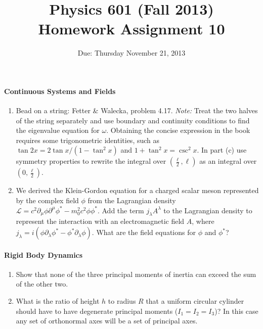 \documentclass[letterpaper,11pt]{article}
\title{Physics 601 (Fall 2013) \\ Homework Assignment 10}
\date{Due: Thursday November 21, 2013}
\begin{document}
\maketitle

\paragraph*{Continuous Systems and Fields}
\begin{enumerate}[resume]
 \item Bead on a string: Fetter \& Walecka, problem 4.17. \emph{Note:} Treat the two halves of the string separately and use boundary and continuity conditions to find the eigenvalue equation for $\omega$.  Obtaining the concise expression in the book requires some trigonometric identities, such as $\tan 2x = 2 \tan x / (1-\tan^2 x)$ and $1 + \tan^2 x = \csc^2 x$.  In part (c) use symmetry properties to rewrite the integral over $(\frac{\ell}{2},\ell)$ as an integral over $(0,\frac{\ell}{2})$.
 \item We derived the Klein-Gordon equation for a charged scalar meson represented by the complex field $\phi$ from the Lagrangian density $\mathcal{L} = c^2 \partial_\mu \phi \partial^\mu \phi^* - m_0^2 c^2 \phi \phi^*$.  Add the term $j_\lambda A^\lambda$ to the Lagrangian density to represent the interaction with an electromagnetic field $A$, where $j_\lambda = i(\phi \partial_\lambda \phi^* - \phi^* \partial_\lambda \phi)$.  What are the field equations for $\phi$ and $\phi^*$?
\end{enumerate}

\paragraph*{Rigid Body Dynamics}
\begin{enumerate}[resume]
 \item Show that none of the three principal moments of inertia can exceed the sum of the other two.
 \item What is the ratio of height $h$ to radius $R$ that a uniform circular cylinder should have to have degenerate principal moments ($I_1 = I_2 = I_3$)?  In this case any set of orthonormal axes will be a set of principal axes.
\end{enumerate}
\end{document}
